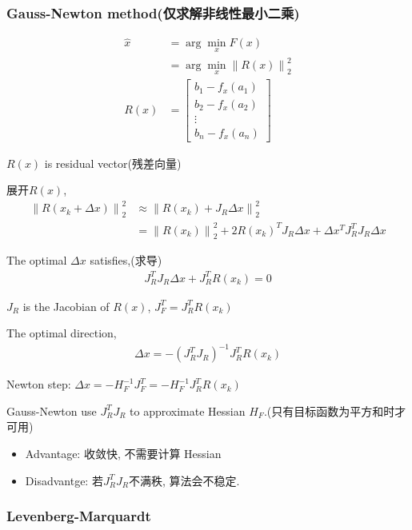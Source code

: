     \subsubsection{Gauss-Newton method(仅求解非线性最小二乘)}
    \begin{align*}
        \hat{x}&=\arg\min_xF(x)\\
        &=\arg\min_x\left\| R(x) \right\|_2^2\\
        R(x)&=\begin{bmatrix}
            b_1-f_x(a_1)\\
            b_2-f_x(a_2)\\
            \vdots\\
            b_n-f_x(a_n)
        \end{bmatrix}
    \end{align*}

    $R(x)$ is residual vector(残差向量)

    展开$R(x)$,
    \begin{align*}
        \left\| R(x_k+\Delta x) \right\|_2^2 &\approx \left\| R(x_k)+J_R\Delta x \right\|_2^2\\
        &=\left\| R(x_k) \right\|_2^2+2R(x_k)^TJ_R\Delta x+\Delta x^T J_R^T J_R \Delta x
    \end{align*}

    The optimal $\Delta x$ satisfies,(求导)
    \begin{align*}
        J_R^T J_R \Delta x+J_R^T R(x_k)=0
    \end{align*}

    $J_R$ is the Jacobian of $R(x)$, $J_F^T=J_R^T R(x_k)$

    The optimal direction,
    \begin{align*}
        \Delta x=-(J_R^T J_R)^{-1} J_R^T R(x_k)
    \end{align*}

    Newton step: $\Delta x=-H_F^{-1}J_F^T=-H_F^{-1}J_R^T R(x_k)$

    Gauss-Newton use $J_R^T J_R$ to approximate Hessian $H_F$.(只有目标函数为平方和时才可用)
    \begin{itemize}
        \item Advantage: 收敛快, 不需要计算 Hessian
        \item Disadvantge: 若$J_R^T J_R$不满秩, 算法会不稳定.
    \end{itemize}

    \subsubsection{Levenberg-Marquardt}
        
